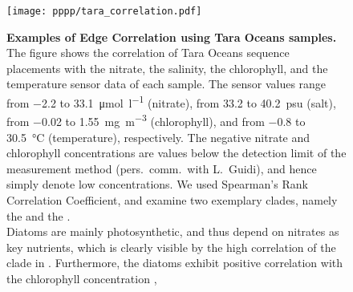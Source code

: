 \begin{figure}[hpbt]
    \centering
    \texttt{[image: pppp/tara\_correlation.pdf]}
    \begin{subfigure}{0pt}
        \label{fig:tara_correlation:sub:nitrate}
    \end{subfigure}
    \begin{subfigure}{0pt}
        \label{fig:tara_correlation:sub:salinity}
    \end{subfigure}
    \begin{subfigure}{0pt}
        \label{fig:tara_correlation:sub:chlorophyll}
    \end{subfigure}
    \begin{subfigure}{0pt}
        \label{fig:tara_correlation:sub:temperature}
    \end{subfigure}
    \caption[Examples of Edge Correlation using Tara Oceans samples]{
        \textbf{Examples of Edge Correlation using Tara Oceans samples.}
        The figure shows the correlation of Tara Oceans sequence placements with
         the nitrate,
         the salinity,
         the chlorophyll, and
         the temperature sensor data of each sample.
        The sensor values range from \SI{-2.2}{} to \SI[per-mode=symbol]{33.1}{\micro\mole\per\litre} (nitrate),
        from \SI{33.2}{} to \SI{40.2}{psu} (salt),
        from \SI{-0.02}{} to \SI[per-mode=symbol]{1.55}{\milli\gram\per\cubic\metre} (chlorophyll), and
        from \SI{-0.8}{} to \SI{30.5}{\celsius} (temperature), respectively.
        The negative nitrate and chlorophyll concentrations are
        values below the detection limit of the measurement method (pers.~comm.~with L.~Guidi),
        and hence simply denote low concentrations.
        We used Spearman's Rank Correlation Coefficient,
        and examine two exemplary clades, namely the  and the .
        \\
        Diatoms are mainly photosynthetic, and thus depend on nitrates as key nutrients,
        which is clearly visible by the high correlation of the clade in .
        Furthermore, the diatoms exhibit positive correlation
        with the chlorophyll concentration ,
}
\end{figure}

